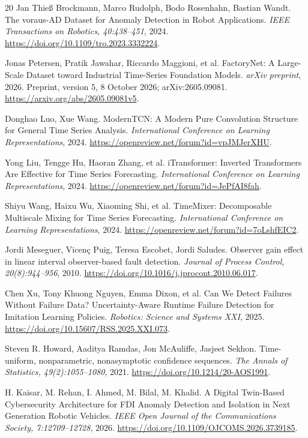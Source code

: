 \begin{thebibliography}{20}
 Jan Thieß Brockmann, Marco Rudolph, Bodo Rosenhahn, Bastian Wandt. {The voraus-AD Dataset for Anomaly Detection in Robot Applications}. \emph{IEEE Transactions on Robotics, 40:438--451}, 2024. \url{https://doi.org/10.1109/tro.2023.3332224}.

 Jonas Petersen, Pratik Jawahar, Riccardo Maggioni, et al. {FactoryNet: A Large-Scale Dataset toward Industrial Time-Series Foundation Models}. \emph{arXiv preprint}, 2026. Preprint, version 5, 8 October 2026; arXiv:2605.09081. \url{https://arxiv.org/abs/2605.09081v5}.

 Donghao Luo, Xue Wang. {ModernTCN: A Modern Pure Convolution Structure for General Time Series Analysis}. \emph{International Conference on Learning Representations}, 2024. \url{https://openreview.net/forum?id=vpJMJerXHU}.

 Yong Liu, Tengge Hu, Haoran Zhang, et al. {iTransformer: Inverted Transformers Are Effective for Time Series Forecasting}. \emph{International Conference on Learning Representations}, 2024. \url{https://openreview.net/forum?id=JePfAI8fah}.


 Shiyu Wang, Haixu Wu, Xiaoming Shi, et al. {TimeMixer: Decomposable Multiscale Mixing for Time Series Forecasting}. \emph{International Conference on Learning Representations}, 2024. \url{https://openreview.net/forum?id=7oLshfEIC2}.

 Jordi Meseguer, Vicen{\c c} Puig, Teresa Escobet, Jordi Saludes. {Observer gain effect in linear interval observer-based fault detection}. \emph{Journal of Process Control, 20(8):944--956}, 2010. \url{https://doi.org/10.1016/j.jprocont.2010.06.017}.

 Chen Xu, Tony Khuong Nguyen, Emma Dixon, et al. {Can We Detect Failures Without Failure Data? Uncertainty-Aware Runtime Failure Detection for Imitation Learning Policies}. \emph{Robotics: Science and Systems XXI}, 2025. \url{https://doi.org/10.15607/RSS.2025.XXI.073}.

 Steven R. Howard, Aaditya Ramdas, Jon McAuliffe, Jasjeet Sekhon. {Time-uniform, nonparametric, nonasymptotic confidence sequences}. \emph{The Annals of Statistics, 49(2):1055--1080}, 2021. \url{https://doi.org/10.1214/20-AOS1991}.

 H. Kaisar, M. Rehan, I. Ahmed, M. Bilal, M. Khalid. {A Digital Twin-Based Cybersecurity Architecture for FDI Anomaly Detection and Isolation in Next Generation Robotic Vehicles}. \emph{IEEE Open Journal of the Communications Society, 7:12709--12728}, 2026. \url{https://doi.org/10.1109/OJCOMS.2026.3739185}.


\end{thebibliography}
